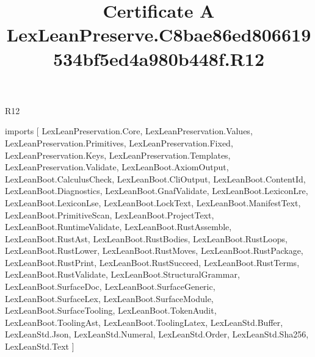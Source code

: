 \begin{lexlean}{R12}
\title{Certificate A LexLeanPreserve.C8bae86ed806619534bf5ed4a980b448f.R12}
\begin{coremodule}
imports [
  LexLeanPreservation.Core,
  LexLeanPreservation.Values,
  LexLeanPreservation.Primitives,
  LexLeanPreservation.Fixed,
  LexLeanPreservation.Keys,
  LexLeanPreservation.Templates,
  LexLeanPreservation.Validate,
  LexLeanBoot.AxiomOutput,
  LexLeanBoot.CalculusCheck,
  LexLeanBoot.CliOutput,
  LexLeanBoot.ContentId,
  LexLeanBoot.Diagnostics,
  LexLeanBoot.GnafValidate,
  LexLeanBoot.LexiconLre,
  LexLeanBoot.LexiconLse,
  LexLeanBoot.LockText,
  LexLeanBoot.ManifestText,
  LexLeanBoot.PrimitiveScan,
  LexLeanBoot.ProjectText,
  LexLeanBoot.RuntimeValidate,
  LexLeanBoot.RustAssemble,
  LexLeanBoot.RustAst,
  LexLeanBoot.RustBodies,
  LexLeanBoot.RustLoops,
  LexLeanBoot.RustLower,
  LexLeanBoot.RustMoves,
  LexLeanBoot.RustPackage,
  LexLeanBoot.RustPrint,
  LexLeanBoot.RustSucceed,
  LexLeanBoot.RustTerms,
  LexLeanBoot.RustValidate,
  LexLeanBoot.StructuralGrammar,
  LexLeanBoot.SurfaceDoc,
  LexLeanBoot.SurfaceGeneric,
  LexLeanBoot.SurfaceLex,
  LexLeanBoot.SurfaceModule,
  LexLeanBoot.SurfaceTooling,
  LexLeanBoot.TokenAudit,
  LexLeanBoot.ToolingAst,
  LexLeanBoot.ToolingLatex,
  LexLeanStd.Buffer,
  LexLeanStd.Json,
  LexLeanStd.Numeral,
  LexLeanStd.Order,
  LexLeanStd.Sha256,
  LexLeanStd.Text
]


\end{coremodule}
\end{lexlean}
